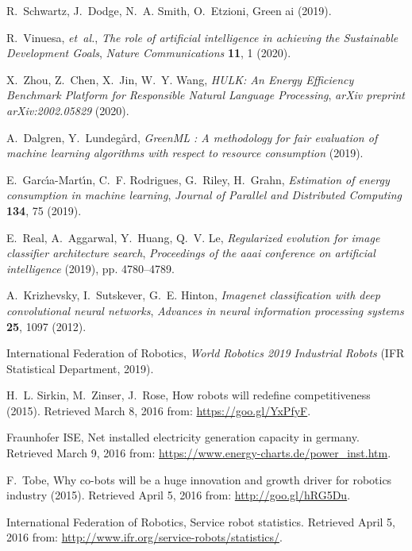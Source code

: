 \documentclass[12pt]{article}
\begin{document}
\begin{thebibliography}{10}
	R.~Schwartz, J.~Dodge, N.~A. Smith, O.~Etzioni, Green ai (2019).
	
	R.~Vinuesa, {\it et~al.\/}, {\it The role of artificial intelligence in
		achieving the {S}ustainable {D}evelopment {G}oals\/}, {\it Nature
		Communications\/} {\bf 11}, 1 (2020).
	
	X.~Zhou, Z.~Chen, X.~Jin, W.~Y. Wang, {\it HULK: An Energy Efficiency Benchmark
		Platform for Responsible Natural Language Processing\/}, {\it arXiv preprint
		arXiv:2002.05829\/}  (2020).
	
	A.~Dalgren, Y.~Lundeg{\aa}rd, {\it GreenML : A methodology for fair evaluation
		of machine learning algorithms with respect to resource consumption\/}
	(2019).
	
	E.~Garc{\'\i}a-Mart{\'\i}n, C.~F. Rodrigues, G.~Riley, H.~Grahn, {\it
		Estimation of energy consumption in machine learning\/}, {\it Journal of
		Parallel and Distributed Computing\/} {\bf 134}, 75 (2019).
	
	E.~Real, A.~Aggarwal, Y.~Huang, Q.~V. Le, {\it Regularized evolution for image
		classifier architecture search\/}, {\it Proceedings of the aaai conference on
		artificial intelligence\/} (2019), pp. 4780--4789.
	
	A.~Krizhevsky, I.~Sutskever, G.~E. Hinton, {\it Imagenet classification with
		deep convolutional neural networks\/}, {\it Advances in neural information
		processing systems\/} {\bf 25}, 1097 (2012).
	
	{\relax International Federation of Robotics}, {\it World Robotics 2019
		Industrial Robots\/} (IFR Statistical Department, 2019).
	
	H.~L. Sirkin, M.~Zinser, J.~Rose, How robots will redefine competitiveness
	(2015). Retrieved March 8, 2016 from: \url{https://goo.gl/YxPfyF}.
	
	{\relax Fraunhofer ISE}, Net installed electricity generation capacity in
	germany. Retrieved March 9, 2016 from:
	\url{https://www.energy-charts.de/power_inst.htm}.
	
	F.~Tobe, Why co-bots will be a huge innovation and growth driver for robotics
	industry (2015). Retrieved April 5, 2016 from: \url{http://goo.gl/hRG5Du}.
	
	{\relax International Federation of Robotics}, Service robot statistics.
	Retrieved April 5, 2016 from:
	\url{http://www.ifr.org/service-robots/statistics/}.
	

\end{thebibliography}
\end{document}
